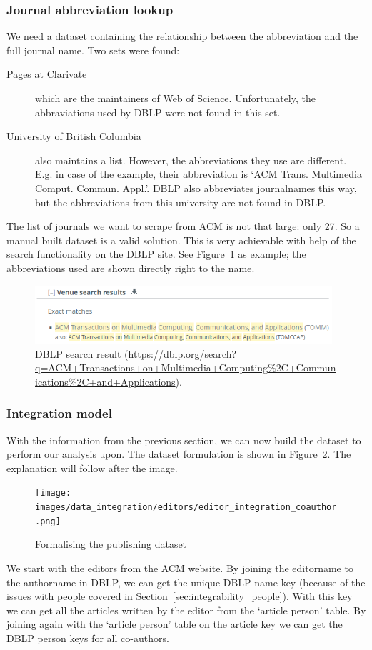 \documentclass{ou-report}
\newcommand{\dblp}{DBLP}
\begin{document}
\subsubsection{Journal abbreviation lookup}
We need a dataset containing the relationship between the abbreviation and the
full journal name. Two sets were found:
\begin{description}
    \item[Pages at Clarivate] which are the maintainers of Web of Science. 
    Unfortunately, the abbraviations used by DBLP were not found in this set.
    \item[University of British Columbia] also maintains a list. However, the 
    abbreviations they use are different. E.g. in case of the example, their
    abbreviation is `ACM Trans. Multimedia Comput. Commun. Appl.'. \dblp{}
    also abbreviates journalnames this way, but the 
    abbreviations from this university are not found in \dblp{}.
\end{description}
The list of journals we want to scrape from ACM is not that large: only 27. So
a manual built dataset is a valid solution. This is very achievable 
with help of the search functionality on the DBLP site. See 
Figure~\ref{fig:dblp_search_result} as example; the abbreviations used are shown
directly right to the name.
\begin{figure}[H]
\centering
\includegraphics[width=11cm]{images/dblp_search_result.png}
\caption{DBLP search result (\url{https://dblp.org/search?q=ACM+Transactions+on+Multimedia+Computing\%2C+Communications\%2C+and+Applications}).}
\label{fig:dblp_search_result}
\end{figure}
\subsubsection{Integration model}
With the information from the previous section, we can now build the dataset to
perform our analysis upon. The dataset formulation is shown in 
Figure~\ref{fig:editors_integration_coauthor}. The explanation will follow 
after the image.
\begin{figure}[H]
    \centering
    \texttt{[image: images/data\_integration/editors/editor\_integration\_coauthor.png]}
    \caption{Formalising the publishing dataset}
    \label{fig:editors_integration_coauthor}
\end{figure}
We start with the editors from the ACM website. By joining the editorname 
to the authorname in DBLP, we can get the unique DBLP name key (because of the 
issues with people covered in Section~\ref{sec:integrability_people}). With this 
key we can get all the articles written by the editor from the `article person'
table. By joining again with the `article person' table on the article key we 
can get the DBLP person keys for all co-authors.
\end{document}
